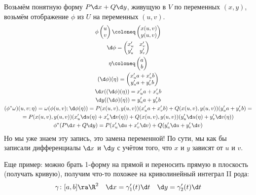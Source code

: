 \begin{exmp}
	Возьмём понятную форму $P \d x + Q \d y$, живущую в $V$ по переменных $(x,y)$,
	возьмём отображение $\phi$ из $U$ на переменных $(u,v)$.
	\begin{gather*}
		\phi \begin{pmatrix} u \\ v \end{pmatrix} \coloneq \begin{pmatrix} x(u, v) \\ y(u, v) \end{pmatrix} \\
		\d \phi = \begin{pmatrix} x_u' & x_v' \\ y_u' & y_v' \end{pmatrix} \\
		\eta \coloneq \begin{pmatrix} a \\ b \end{pmatrix} \\
		(\d \phi)(\eta) = \begin{pmatrix} x_u'a + x_v'b \\ y_u'a + y_v'b \end{pmatrix} \\
		\d x ((\d \phi)(\eta)) = x_u'a + x_v'b \\
		\d y ((\d \phi)(\eta)) = y_u'a + y_v'b \\
		(\phi^* \omega) (u, v; \eta)
		= \omega(\phi(u, v); \d \phi(\eta))
		= P(x(u, v), y(u, v)) (x_u' a + x_v' b)
		+ Q(x(u, v), y(u, v)) (y_u' a + y_v' b) = \\
		= P(x(u, v), y(u, v)) (x_u' \d u(\eta) + x_v' \d v(\eta))
		+ Q(x(u, v), y(u, v)) (y_u' \d u(\eta) + y_v' \d v(\eta)) \\
		\phi^* (P \d x + Q \d y) = P(x_u' \d u + x_v' \d v) + Q(y_u' \d u + y_v' \d v)
	\end{gather*}
	Но мы уже знаем эту запись, это замена переменной!
	По сути, мы как бы записали дифференциалы $\d x$ и $\d y$ с учётом того, что
	$x$ и $y$ зависят от $u$ и $v$.

	Еще пример: можно брать 1-форму на прямой и переносить прямую в плоскость (получать кривую),
	получим что-то похожее на криволинейный интеграл II рода:
	\begin{gather*}
		\gamma\colon [a, b] \ra \R^2 \quad \d x = \gamma_1'(t) \d t \quad \d y = \gamma_2'(t) \d t
	\end{gather*}
\end{exmp}

